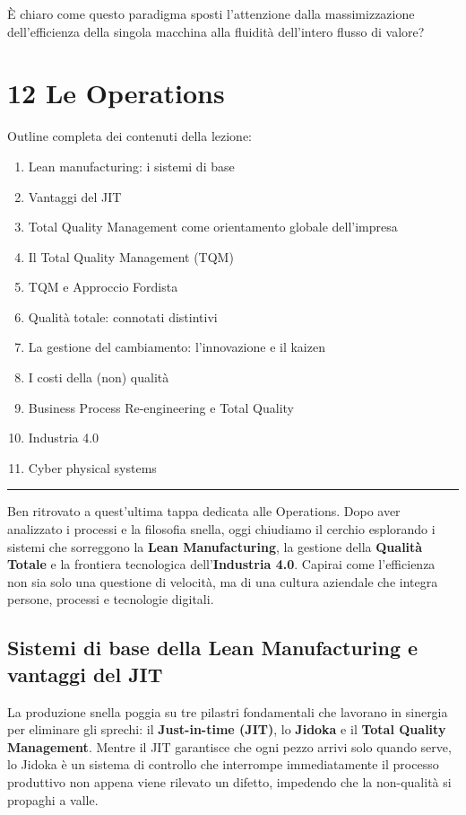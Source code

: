 \documentclass[a4paper,10pt]{article}
\begin{document}
È chiaro come questo paradigma sposti l'attenzione dalla massimizzazione dell'efficienza della singola macchina alla fluidità dell'intero flusso di valore?
\section*{12 Le Operations}

Outline completa dei contenuti della lezione:
{\small
\begin{enumerate}
\item Lean manufacturing: i sistemi di base
\item Vantaggi del JIT
\item Total Quality Management come orientamento globale dell’impresa
\item Il Total Quality Management (TQM)
\item TQM e Approccio Fordista
\item Qualità totale: connotati distintivi
\item La gestione del cambiamento: l’innovazione e il kaizen
\item I costi della (non) qualità
\item Business Process Re-engineering e Total Quality
\item Industria 4.0
\item Cyber physical systems
\end{enumerate}
}
\hrule
\vspace{0.5cm}

Ben ritrovato a quest'ultima tappa dedicata alle Operations. Dopo aver analizzato i processi e la filosofia snella, oggi chiudiamo il cerchio esplorando i sistemi che sorreggono la \textbf{Lean Manufacturing}, la gestione della \textbf{Qualità Totale} e la frontiera tecnologica dell'\textbf{Industria 4.0}. Capirai come l'efficienza non sia solo una questione di velocità, ma di una cultura aziendale che integra persone, processi e tecnologie digitali.

\subsection*{Sistemi di base della Lean Manufacturing e vantaggi del JIT}

La produzione snella poggia su tre pilastri fondamentali che lavorano in sinergia per eliminare gli sprechi: il \textbf{Just-in-time (JIT)}, lo \textbf{Jidoka} e il \textbf{Total Quality Management}. Mentre il JIT garantisce che ogni pezzo arrivi solo quando serve, lo Jidoka è un sistema di controllo che interrompe immediatamente il processo produttivo non appena viene rilevato un difetto, impedendo che la non-qualità si propaghi a valle.
\end{document}
